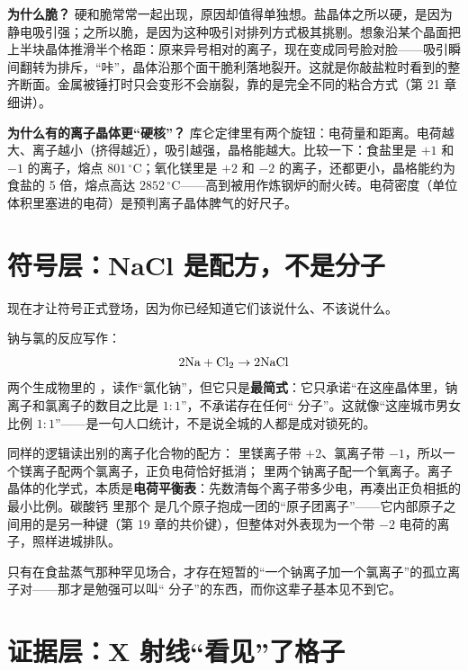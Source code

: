 \textbf{为什么脆？} 硬和脆常常一起出现，原因却值得单独想。盐晶体之所以硬，是因为静电吸引强；之所以脆，是因为这种吸引对排列方式极其挑剔。想象沿某个晶面把上半块晶体推滑半个格距：原来异号相对的离子，现在变成同号脸对脸——吸引瞬间翻转为排斥，“咔”，晶体沿那个面干脆利落地裂开。这就是你敲盐粒时看到的整齐断面。金属被锤打时只会变形不会崩裂，靠的是完全不同的粘合方式（第 21 章细讲）。

\textbf{为什么有的离子晶体更“硬核”？} 库仑定律里有两个旋钮：电荷量和距离。电荷越大、离子越小（挤得越近），吸引越强，晶格能越大。比较一下：食盐里是 $+1$ 和 $-1$ 的离子，熔点 $801\,^{\circ}\mathrm{C}$；氧化镁里是 $+2$ 和 $-2$ 的离子，还都更小，晶格能约为食盐的 5 倍，熔点高达 $2852\,^{\circ}\mathrm{C}$——高到被用作炼钢炉的耐火砖。电荷密度（单位体积里塞进的电荷）是预判离子晶体脾气的好尺子。

\section{符号层：NaCl 是配方，不是分子}

现在才让符号正式登场，因为你已经知道它们该说什么、不该说什么。

钠与氯的反应写作：
\[\mathrm{2Na} + \mathrm{Cl_2} \rightarrow \mathrm{2NaCl}\]
两个生成物里的 ，读作“氯化钠”，但它只是\textbf{最简式}：它只承诺“在这座晶体里，钠离子和氯离子的数目之比是 $1:1$”，不承诺存在任何“ 分子”。这就像“这座城市男女比例 $1:1$”——是一句人口统计，不是说全城的人都是成对锁死的。

同样的逻辑读出别的离子化合物的配方： 里镁离子带 $+2$、氯离子带 $-1$，所以一个镁离子配两个氯离子，正负电荷恰好抵消； 里两个钠离子配一个氧离子。离子晶体的化学式，本质是\textbf{电荷平衡表}：先数清每个离子带多少电，再凑出正负相抵的最小比例。碳酸钙  里那个  是几个原子抱成一团的“原子团离子”——它内部原子之间用的是另一种键（第 19 章的共价键），但整体对外表现为一个带 $-2$ 电荷的离子，照样进城排队。

只有在食盐蒸气那种罕见场合，才存在短暂的“一个钠离子加一个氯离子”的孤立离子对——那才是勉强可以叫“ 分子”的东西，而你这辈子基本见不到它。

\section{证据层：X 射线“看见”了格子}

